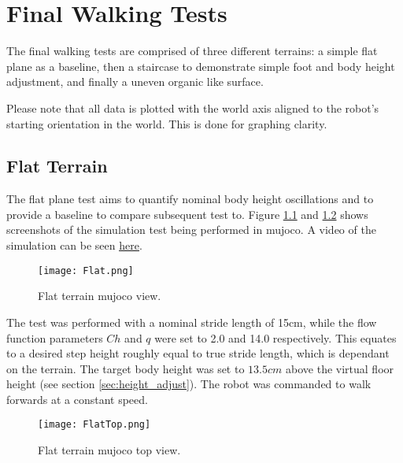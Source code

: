 \chapter{Final Walking Tests}
    The final walking tests are comprised of three different terrains: a simple flat plane as a baseline, then a staircase to demonstrate simple foot and body height adjustment, and finally a uneven organic like surface.

    Please note that all data is plotted with the world axis aligned to the robot's starting orientation in the world. This is done for graphing clarity.
    

    \section{Flat Terrain}
    The flat plane test aims to quantify nominal body height oscillations and to provide a baseline to compare subsequent test to. Figure \ref{fig:plane_test} and \ref{fig:plane_test_top} shows screenshots of the simulation test being performed in \ac{mujoco}. A video of the simulation can be seen \href{https://youtu.be/pw4GzVp-8aQ}{\underline{here}}.
    \begin{figure}[h]
        \centering
        \texttt{[image: Flat.png]}
        \caption{Flat terrain \ac{mujoco} view.}
        \label{fig:plane_test}
    \end{figure}

    \noindent
    The test was performed with a nominal stride length of 15cm, while the flow function parameters \(Ch\) and \(q\) were set to 2.0 and 14.0 respectively. This equates to a desired step height roughly equal to true stride length, which is dependant on the terrain. The target body height was set to \(13.5cm\) above the virtual floor height (see section \ref{sec:height_adjust}). The robot was commanded to walk forwards at a constant speed.
    \begin{figure}[h]
        \centering
        \texttt{[image: FlatTop.png]}
        \caption{Flat terrain \ac{mujoco} top view.}
        \label{fig:plane_test_top}
    \end{figure}
    
